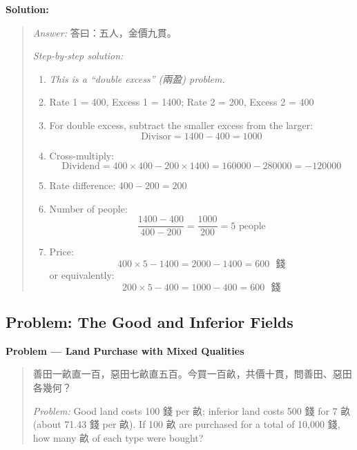 \documentclass[11pt,a4paper]{article}
\newcommand{\zh}[1]{{#1}}
\newenvironment{chproblem}[1][]{%
  \par\medskip\noindent\textbf{\textcolor{sectioncolor}{#1}}\par\nopagebreak
  \begin{quote}\small
}{%
  \end{quote}\medskip
}
\newenvironment{chsolution}{%
  \par\medskip\noindent\textbf{\textcolor{notecolor}{Solution:}}\par\nopagebreak
  \begin{quote}\small
}{%
  \end{quote}\medskip
}
\newenvironment{stepbystep}{%
  \par\smallskip\noindent\textit{Step-by-step solution:}\par\nopagebreak
  \begin{enumerate}[leftmargin=2em,label=\textbf{Step \arabic*:},ref=\arabic*]
}{%
  \end{enumerate}\medskip
}
\begin{document}
\begin{chsolution}
\textit{Answer:} \zh{答曰：五人，金價九貫。}

\begin{stepbystep}
\item \textit{This is a ``double excess'' (\zh{兩盈}) problem.}

\item Rate 1 = 400, Excess 1 = 1400; Rate 2 = 200, Excess 2 = 400

\item For double excess, subtract the smaller excess from the larger:
\[
\text{Divisor} = 1400 - 400 = 1000
\]

\item Cross-multiply:
\[
\text{Dividend} = 400 \times 400 - 200 \times 1400 = 160000 - 280000 = -120000
\]

\item Rate difference: $400 - 200 = 200$

\item Number of people:
\[
\frac{1400 - 400}{400 - 200} = \frac{1000}{200} = 5 \text{ people}
\]

\item Price:
\[
400 \times 5 - 1400 = 2000 - 1400 = 600 \text{ \zh{錢}}
\]
or equivalently:
\[
200 \times 5 - 400 = 1000 - 400 = 600 \text{ \zh{錢}}
\]
\end{stepbystep}
\end{chsolution}

\subsection{Problem: The Good and Inferior Fields}

\begin{chproblem}[Problem --- Land Purchase with Mixed Qualities]
\zh{善田一畝直一百，惡田七畝直五百。今買一百畝，共價十貫，問善田、惡田各幾何？}

\medskip
\textit{Problem:} Good land costs 100 \zh{錢} per \zh{畝}; inferior land
costs 500 \zh{錢} for 7 \zh{畝} (about 71.43 \zh{錢} per \zh{畝}). If
100 \zh{畝} are purchased for a total of 10,000 \zh{錢}, how many \zh{畝} of
each type were bought?
\end{chproblem}
\end{document}
